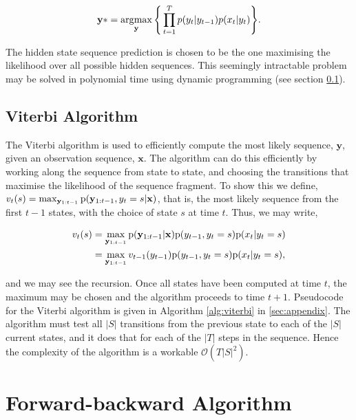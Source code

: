 \begin{equation}
\textbf{y}* = \operatorname*{\arg\!\max}_{\textbf{y}}\Bigg\{\prod_{t=1}^T p(y_t | y_{t-1})p(x_t | y_t)\Bigg\}.
\label{eq:argmax}
\end{equation}

The hidden state sequence prediction is chosen to be the one maximising the likelihood over all possible hidden sequences. This seemingly intractable problem may be solved in polynomial time using dynamic programming (see section \ref{subsec:viterbi}).

\subsection{Viterbi Algorithm}
\label{subsec:viterbi}

The Viterbi algorithm is used to efficiently compute the most likely sequence, $\textbf{y}$, given an observation sequence, $\textbf{x}$. The algorithm can do this efficiently by working along the sequence from state to state, and choosing the transitions that maximise the likelihood of the sequence fragment. To show this we define, $v_t(s) = \max_{\mathbf{y}_{1:t-1}} \text{p}(\mathbf{y}_{1:t-1}, y_t = s | \mathbf{x})$, that is, the most likely sequence from the first $t-1$ states, with the choice of state $s$ at time $t$. Thus, we may write,

\begin{equation}
\begin{aligned}
v_t(s) &= \max_{\mathbf{y}_{1:t-1}} \text{p}(\mathbf{y}_{1:t-1} | \mathbf{x}) \text{p}(y_{t-1}, y_t = s) \text{p}(x_t | y_t = s) \\
&= \max_{\mathbf{y}_{1:t-1}} v_{t-1}(y_{t-1}) \text{p}(y_{t-1}, y_t = s) \text{p}(x_t | y_t = s), 
\end{aligned}
\label{eq:viterbi}
\end{equation}

and we may see the recursion. Once all states have been computed at time $t$, the maximum may be chosen and the algorithm proceeds to time $t+1$. Pseudocode for the Viterbi algorithm is given in Algorithm \ref{alg:viterbi} in \ref{sec:appendix}. The algorithm must test all $|S|$ transitions from the previous state to each of the $|S|$ current states, and it does that for each of the $|T|$ steps in the sequence. Hence the complexity of the algorithm is a workable $\mathcal{O}(T|S|^2)$.

\section{Forward-backward Algorithm}
\label{sec:fb}

